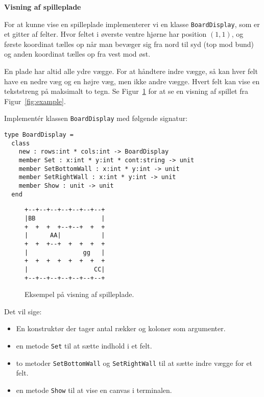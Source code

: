 \textbf{Visning af spilleplade}

For at kunne vise en spilleplade implementerer vi en klasse
\lstinline{BoardDisplay}, som er et gitter af felter. Hvor feltet
i øverste ventre hjørne har position $(1,1)$, og første koordinat
tælles op når man bevæger sig
fra nord til syd (top mod bund) og anden koordinat tælles op fra vest mod øst.

En plade har altid alle ydre vægge. For at håndtere indre vægge, så
kan hver felt have en nedre væg og en højre væg, men ikke andre vægge.
Hvert felt kan vise en tekststreng på maksimalt to tegn. Se
Figur~\ref{fig:example-text} for at se en visning af spillet fra
Figur~\ref{fig:example}.

Implementér klassen \lstinline{BoardDisplay} med følgende signatur:

\begin{lstlisting}
type BoardDisplay =
  class
    new : rows:int * cols:int -> BoardDisplay
    member Set : x:int * y:int * cont:string -> unit
    member SetBottomWall : x:int * y:int -> unit
    member SetRightWall : x:int * y:int -> unit
    member Show : unit -> unit
  end
\end{lstlisting}

\begin{figure}%
  \begin{center}
    \begin{minipage}{5cm}
\begin{verbatim}
+--+--+--+--+--+--+--+
|BB                  |
+  +  +  +--+--+  +  +
|      AA|           |
+  +  +--+  +  +  +  +
|               gg   |
+  +  +  +  +  +  +  +
|                  CC|
+--+--+--+--+--+--+--+
\end{verbatim}
    \end{minipage}
  \end{center}
  \caption{Eksempel på visning af spilleplade.}
  \label{fig:example-text}
\end{figure}

Det vil sige:
\begin{itemize}
\item En konstruktør der tager antal rækker og koloner som argumenter.
\item en metode \lstinline{Set} til at sætte indhold i et
  felt.
\item to metoder \lstinline{SetBottomWall} og \lstinline{SetRightWall}
  til at sætte indre vægge for et
  felt.
\item en metode \lstinline{Show} til at vise en canvas i
  terminalen.
\end{itemize}

